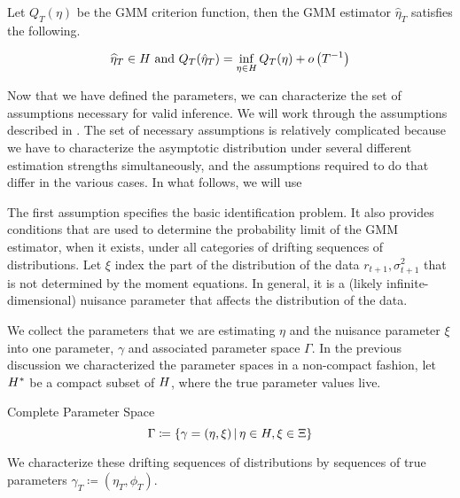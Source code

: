 \documentclass[11pt, letterpaper, twoside, final]{article}
\begin{document}
Let $Q_T(\eta)$ be the GMM criterion function, then the GMM estimator $\hat{\eta}_T$ satisfies the following.


\begin{equation}
    \widehat{\eta}_T \in \Eta\ \text{and}\ Q_T(\hat{\eta}_T) = \inf_{\eta \in \Eta} Q_T(\eta) +
    o\left(T^{-1}\right) 
\end{equation}


Now that we have defined the parameters, we can characterize the set of assumptions necessary for valid inference.
We will work through the assumptions described in \textcite{andrews2014Gmm}.
The set of necessary assumptions is relatively complicated because we have to characterize the asymptotic
distribution under several different estimation strengths simultaneously, and the assumptions required to do that
  differ in the various cases. 
In what follows, we will use 

The first assumption specifies the basic identification
problem. It also provides conditions that are used to determine the
probability limit of the GMM estimator, when it exists, under all categories
of drifting sequences of distributions.
Let $\xi$ index the part of the distribution of the data $r_{t+1}, \sigma^2_{t+1}$ that is not determined by the
moment equations.
In general, it is a (likely infinite-dimensional) nuisance parameter that affects the distribution of the data. 


We collect the parameters that we are estimating $\eta$ and the nuisance parameter $\xi$ into one parameter,
$\gamma$ and associated parameter space $\Gamma$.
In the previous discussion we characterized the parameter spaces in a non-compact fashion, let $H^{*}$ be a
compact subset of $H$, where the true parameter values live.

\begin{defn}{Complete Parameter Space}
    \begin{equation}
        \Gamma \coloneqq \left\lbrace \gamma = (\eta, \xi) \,\middle\vert\, \eta \in H, \xi \in \Xi \right\rbrace 
    \end{equation}
\end{defn}

We characterize these drifting sequences of distributions by sequences of true parameters $\gamma_T \coloneqq
(\eta_T, \phi_T)$.

\end{document}
